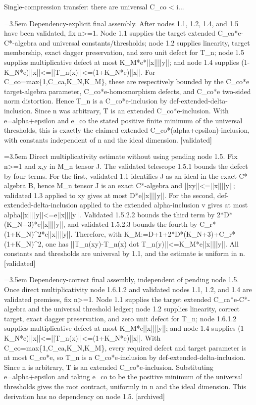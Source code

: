 \documentclass{article}
\newcommand{\step}[1]{\par\noindent\hangindent=3.5em\hangafter=1%
  \makebox[3.5em][l]{\textbf{#1.}}}
\newcommand{\steptag}[1]{\hfill{\small\textsf{[#1]}}}
\begin{document}
\begin{proofbox}{Single-compression transfer: there are universal C\_co < i...}
\step{1.6.1.1} Dependency-explicit final assembly. After nodes 1.1, 1.2, 1.4, and 1.5 have been validated, fix n>=1. Node 1.1 supplies the target extended C\_ca*e-C*-algebra and universal constants/thresholds; node 1.2 supplies linearity, target membership, exact dagger preservation, and zero unit defect for T\_n; node 1.5 supplies multiplicative defect at most K\_M*e*||x||||y||; and node 1.4 supplies (1-K\_N*e)||x||<=||T\_n(x)||<=(1+K\_N*e)||x||. For C\_co=max\{1,C\_ca,K\_N,K\_M\}, these are respectively bounded by the C\_co*e target-algebra parameter, C\_co*e-homomorphism defects, and C\_co*e two-sided norm distortion. Hence T\_n is a C\_co*e-inclusion by def-extended-delta-inclusion. Since n was arbitrary, T is an extended C\_co*e-inclusion. With e=alpha+epsilon and e\_co the stated positive finite minimum of the universal thresholds, this is exactly the claimed extended C\_co*(alpha+epsilon)-inclusion, with constants independent of n and the ideal dimension. \steptag{validated} \\[4pt]
\step{1.6.1.2} Direct multiplicativity estimate without using pending node 1.5. Fix n>=1 and x,y in M\_n tensor J. The validated telescope 1.5.1 bounds the defect by four terms. For the first, validated 1.1 identifies J as an ideal in the exact C*-algebra B, hence M\_n tensor J is an exact C*-algebra and ||xy||<=||x||||y||; validated 1.3 applied to xy gives at most D*e||x||||y||. For the second, def-extended-delta-inclusion applied to the extended alpha-inclusion v gives at most alpha||x||||y||<=e||x||||y||. Validated 1.5.2.2 bounds the third term by 2*D*(K\_N+3)*e||x||||y||, and validated 1.5.2.3 bounds the fourth by C\_r*(1+K\_N)\textasciicircum{}2*e||x||||y||. Therefore, with K\_M:=D+1+2*D*(K\_N+3)+C\_r*(1+K\_N)\textasciicircum{}2, one has ||T\_n(xy)-T\_n(x) dot T\_n(y)||<=K\_M*e||x||||y||. All constants and thresholds are universal by 1.1, and the estimate is uniform in n. \steptag{validated} \\[4pt]
\step{1.6.1.3} Dependency-correct final assembly, independent of pending node 1.5. Once direct multiplicativity node 1.6.1.2 and validated nodes 1.1, 1.2, and 1.4 are validated premises, fix n>=1. Node 1.1 supplies the target extended C\_ca*e-C*-algebra and the universal threshold ledger; node 1.2 supplies linearity, correct target, exact dagger preservation, and zero unit defect for T\_n; node 1.6.1.2 supplies multiplicative defect at most K\_M*e||x||||y||; and node 1.4 supplies (1-K\_N*e)||x||<=||T\_n(x)||<=(1+K\_N*e)||x||. With C\_co=max\{1,C\_ca,K\_N,K\_M\}, every required defect and target parameter is at most C\_co*e, so T\_n is a C\_co*e-inclusion by def-extended-delta-inclusion. Since n is arbitrary, T is an extended C\_co*e-inclusion. Substituting e=alpha+epsilon and taking e\_co to be the positive minimum of the universal thresholds gives the root contract, uniformly in n and the ideal dimension. This derivation has no dependency on node 1.5. \steptag{archived} \\[4pt]

\end{proofbox}
\end{document}
